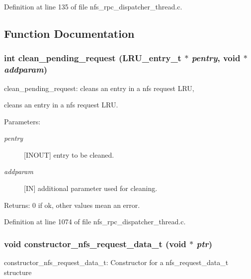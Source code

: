 Definition at line 135 of file nfs\_\-rpc\_\-dispatcher\_\-thread.c.

\subsection{Function Documentation}
\subsubsection{\setlength{\rightskip}{0pt plus 5cm}int clean\_\-pending\_\-request (LRU\_\-entry\_\-t $\ast$ {\em pentry}, void $\ast$ {\em addparam})}\label{nfs__rpc__dispatcher__thread_8c_a24}


clean\_\-pending\_\-request: cleans an entry in a nfs request LRU,

cleans an entry in a nfs request LRU.

\begin{Desc}
\item[Parameters:]
\begin{description}
\item[{\em pentry}][INOUT] entry to be cleaned. \item[{\em addparam}][IN] additional parameter used for cleaning.\end{description}
\end{Desc}
\begin{Desc}
\item[Returns:]0 if ok, other values mean an error. \end{Desc}


Definition at line 1074 of file nfs\_\-rpc\_\-dispatcher\_\-thread.c.
\subsubsection{\setlength{\rightskip}{0pt plus 5cm}void constructor\_\-nfs\_\-request\_\-data\_\-t (void $\ast$ {\em ptr})}\label{nfs__rpc__dispatcher__thread_8c_a29}


constructor\_\-nfs\_\-request\_\-data\_\-t: Constructor for a nfs\_\-request\_\-data\_\-t structure

